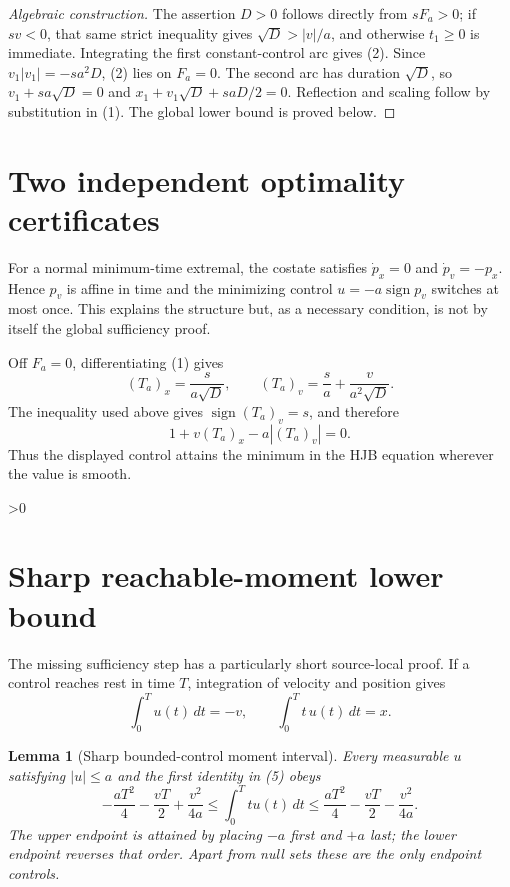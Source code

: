 \documentclass[11pt]{article}
\newtheorem{lemma}{Lemma}
\begin{document}
\begin{proof}[Algebraic construction]
The assertion $D>0$ follows directly from $sF_a>0$; if $sv<0$, that same
strict inequality gives $\sqrt D>|v|/a$, and otherwise $t_1\geq0$ is
immediate.  Integrating the first constant-control arc gives (2).  Since
$v_1|v_1|=-sa^2D$, (2) lies on $F_a=0$.  The second arc has duration
$\sqrt D$, so $v_1+sa\sqrt D=0$ and
$x_1+v_1\sqrt D+saD/2=0$.  Reflection and scaling follow by substitution
in (1).  The global lower bound is proved below.
\end{proof}

\section{Two independent optimality certificates}
For a normal minimum-time extremal, the costate satisfies
$\dot p_x=0$ and $\dot p_v=-p_x$.  Hence $p_v$ is affine in time and the
minimizing control $u=-a\operatorname{sign}p_v$ switches at most once.  This
explains the structure but, as a necessary condition, is not by itself the
global sufficiency proof.

Off $F_a=0$, differentiating (1) gives
\[
 (T_a)_x=\frac{s}{a\sqrt D},\qquad
 (T_a)_v=\frac{s}{a}+\frac{v}{a^2\sqrt D}.
\]
The inequality used above gives $\operatorname{sign}(T_a)_v=s$, and therefore
\[
 1+v(T_a)_x-a|(T_a)_v|=0.                               \tag{4}
\]
Thus the displayed control attains the minimum in the HJB equation wherever
the value is smooth.

\ifnum\CRevisionRound>0
\section{Sharp reachable-moment lower bound}
The missing sufficiency step has a particularly short source-local proof.
If a control reaches rest in time $T$, integration of velocity and position
gives
\[
 \int_0^T u(t)\,dt=-v,\qquad
 \int_0^T t\,u(t)\,dt=x.                                \tag{5}
\]

\begin{lemma}[Sharp bounded-control moment interval]\label{lem:moment}
Every measurable $u$ satisfying $|u|\leq a$ and the first identity in (5)
obeys
\[
 -\frac{aT^2}{4}-\frac{vT}{2}+\frac{v^2}{4a}
 \leq \int_0^T t u(t)\,dt \leq
 \frac{aT^2}{4}-\frac{vT}{2}-\frac{v^2}{4a}.            \tag{6}
\]
The upper endpoint is attained by placing $-a$ first and $+a$ last; the lower
endpoint reverses that order.  Apart from null sets these are the only
endpoint controls.
\end{lemma}
\end{document}

